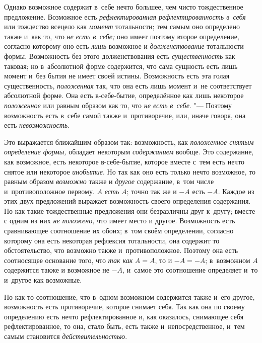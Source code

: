 Однако возможное содержит в~себе нечто большее, чем чисто тождественное
предложение. Возможное есть {\em рефлектированная
рефлектированность в~себя} или тождество всецело как
{\em момент} тотальности; тем самым оно определено
также и~как то, что {\em не есть в~себе;} оно имеет
поэтому второе определение, согласно которому оно есть
{\em лишь} возможное и
{\em долженствование} тотальности формы. Возможность
без этого долженствования есть {\em существенность} как
таковая; но в~абсолютной форме содержится, что сама сущность есть лишь
момент и~без бытия не имеет своей истины. Возможность есть эта голая
существенность, {\em положенная} так, что она есть лишь
момент и~не соответствует абсолютной форме. Она есть в-себе-бытие,
определённое как лишь некоторое {\em положенное} или
равным образом как то, что {\em не есть}
{\em в~себе}. "--- Поэтому возможность есть в~себе самой
также и~противоречие, или, иначе говоря, она есть {\em невозможность}.

Это выражается ближайшим образом так: возможность, как
{\em положенное снятым определение формы,} обладает
некоторым {\em содержанием} вообще. Это содержание, как
возможное, есть некоторое в-себе-бытие, которое вместе с~тем есть нечто
снятое или некоторое {\em инобытие}. Но так как оно
есть только нечто возможное, то равным образом
{\em возможно} также и {\em другое}
содержание, в~том числе и~противоположное первому. $A$ {\em есть}
$A$; точно так же и $-A$ есть $-A$. Каждое из этих двух
предложений выражает возможность своего определения содержания. Но как
такие тождественные предложения они безразличны друг к~другу; вместе с
одним из них {\em не положено,} что имеет место и
другое. Возможность есть сравнивающее соотношение их обоих; в~том своём
определении, согласно которому она есть некоторая рефлексия тотальности,
она содержит то обстоятельство, что возможно также и~противоположное.
Поэтому она есть соотносящее основание того, что
{\em так как} $A=A$, то и $-A=-A$; в~возможном $A$ содержится также и
возможное не $-A$, и~самое это соотношение определяет и~то и~другое
как возможные.

Но как то соотношение, что в~одном возможном содержится также и~его другое,
возможность есть противоречие, которое снимает себя. Так как она по своему
определению есть нечто рефлектированное и, как оказалось, снимающее себя
рефлектированное, то она, стало быть, есть также и~непосредственное, и~тем
самым становится {\em действительностью}.

